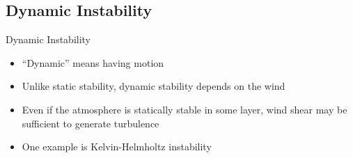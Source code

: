 \subsection{Dynamic Instability}
\begin{frame}{Dynamic Instability}
\begin{itemize}
	\item ``Dynamic'' means having motion
	\item Unlike static stability, dynamic stability depends on the wind
	\item Even if the atmosphere is statically stable in some layer, wind shear may be sufficient to generate turbulence
	\item One example is Kelvin-Helmholtz instability
\end{itemize}
\end{frame}
